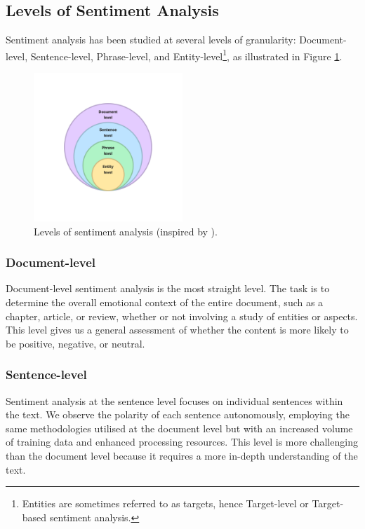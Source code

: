 \subsection{Levels of Sentiment Analysis}
\label{subsec:levels-of-sentiment-analysis}
Sentiment analysis has been studied at several levels of granularity: Document-level, Sentence-level, Phrase-level, and Entity-level\footnote{Entities are sometimes referred to as targets, hence Target-level or Target-based sentiment analysis.}, as illustrated in Figure \ref{fig:sa-levels}.

\begin{figure}[htbp]
    \centering
    \includegraphics[width=0.5\textwidth]{img/theoretical/sa-levels.pdf}
    \caption{Levels of sentiment analysis (inspired by \cite{Wankhade2022}).}
    \label{fig:sa-levels}
\end{figure}

\subsubsection*{Document-level}
\label{subsubsec:document-level}
Document-level sentiment analysis is the most straight level. The task is to determine the overall emotional context of the entire document, such as a chapter, article, or review, whether or not involving a study of entities or aspects. This level gives us a general assessment of whether the content is more likely to be positive, negative, or neutral. 

\subsubsection*{Sentence-level}
\label{subsubsec:sentence-level}
Sentiment analysis at the sentence level focuses on individual sentences within the text. We observe the polarity of each sentence autonomously, employing the same methodologies utilised at the document level but with an increased volume of training data and enhanced processing resources. This level is more challenging than the document level because it requires a more in-depth understanding of the text. 

